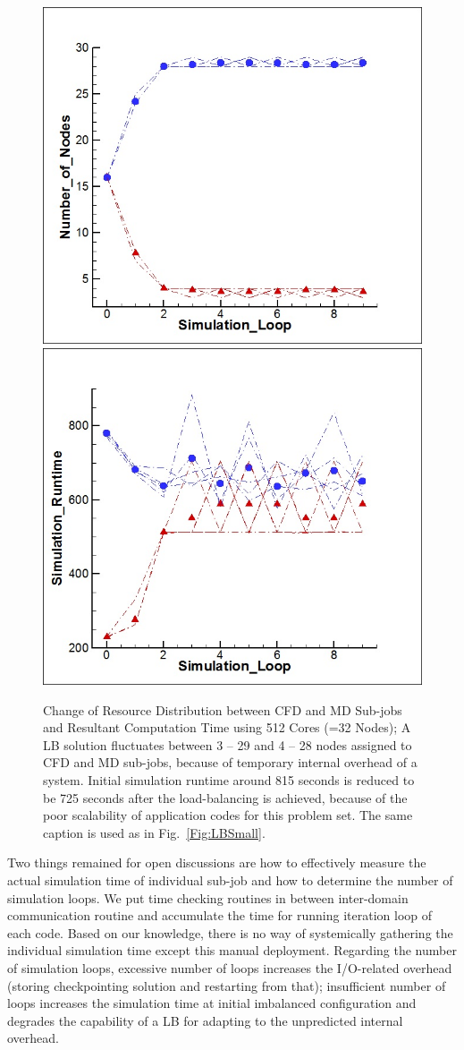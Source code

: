 \documentclass[preprint,12pt]{elsarticle}
\begin{document}
\begin{figure}
\centering
\includegraphics[width=0.3\linewidth]{512_Node.jpg}
\includegraphics[width=0.3\linewidth]{512_Time.jpg}
\caption{\small Change of Resource Distribution between 
CFD and MD Sub-jobs and Resultant Computation Time using 512 Cores (=32 Nodes);
A LB solution fluctuates between 3 -- 29 and 4 -- 28 nodes assigned to
CFD and MD sub-jobs, because of temporary internal overhead of a system.
Initial simulation runtime around 815 seconds is reduced to be 725 seconds
after the load-balancing is achieved, because of the poor scalability of 
application codes for this problem set. 
The same caption is used as in Fig.~\ref{Fig:LBSmall}.
}
\label{Fig:LBLarge}
\vspace{-1em}
\end{figure}

Two things remained for open discussions are how to effectively measure 
the actual simulation time of individual sub-job and how to determine
the number of simulation loops. We put time checking routines in between 
inter-domain communication routine and accumulate the time for 
running iteration loop of each code. Based on our knowledge, 
there is no way of systemically gathering the individual simulation time
except this manual deployment. Regarding the number of simulation loops,
excessive number of loops increases the I/O-related overhead (storing
checkpointing solution and restarting from that); insufficient number of loops
increases the simulation time at initial imbalanced configuration and
degrades the capability of a LB for adapting to the unpredicted internal overhead.
\end{document}
